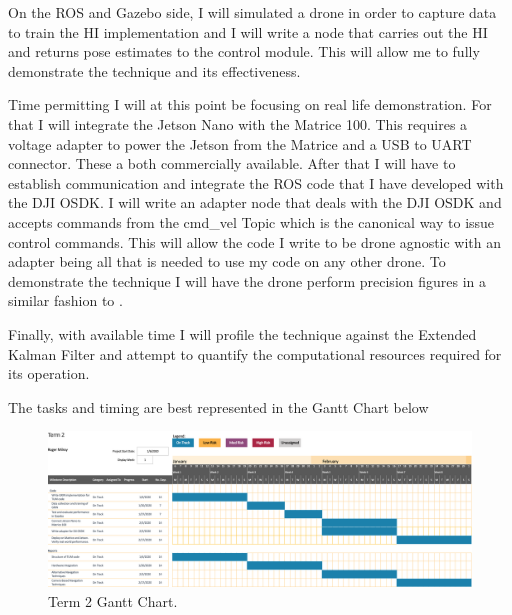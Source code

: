 \documentclass[]{../resources/final_report}
\begin{document}
On the ROS and Gazebo side, I will simulated a drone in order to capture data to train the HI 
implementation and I will write a node that carries out the HI and returns 
pose estimates to the control module. This will allow me to fully demonstrate the technique and 
its effectiveness.

Time permitting I will at this point be focusing on real life demonstration. For that I will 
integrate the Jetson Nano with the Matrice 100. This requires a voltage adapter to power the 
Jetson from the Matrice and a USB to UART connector. These a both commercially available. 
After that I will have to establish communication and integrate the ROS code that I have developed 
with the DJI OSDK. I will write an adapter node that deals with the DJI OSDK and accepts commands 
from the cmd\_vel Topic which is the canonical way to issue control commands. This will allow the 
code I write to be drone agnostic with an adapter being all that is needed to use my code on any 
other drone. To demonstrate the technique I will have the drone perform precision figures in a 
similar fashion to \cite{Engel:FigureFlying}.

Finally, with available time I will profile the technique against the Extended Kalman Filter and
attempt to quantify the computational resources required for its operation.

The tasks and timing are best represented in the Gantt Chart below
\begin{figure}[h]
  \centering
  \includegraphics[width=\textwidth]{Term2GanttChart.png}  
  \caption{Term 2 Gantt Chart.}
  \label{}
\end{figure}


\newpage


\nocite{*}

\label{endpage}
\end{document}
